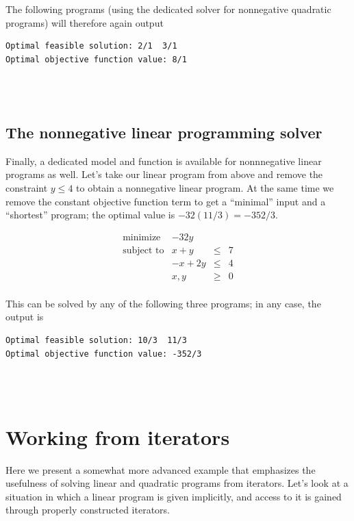 The following programs (using the dedicated solver for nonnegative
quadratic programs) will therefore again output
\begin{verbatim}
Optimal feasible solution: 2/1  3/1
Optimal objective function value: 8/1
\end{verbatim}

\\
\\

\subsection{The nonnegative linear programming solver}
Finally, a dedicated model and function is available for nonnnegative linear
programs as well. Let's take our linear program from above and remove
the constraint $y\leq 4$ to obtain a nonnegative linear program. At
the same time we remove the constant objective function term to get
a ``minimal'' input and a ``shortest'' program; the optimal value is
$-32(11/3)=-352/3$.

\[
\begin{array}{lrcl}
\mbox{minimize}       & - 32y \\
\mbox{subject to}     & x + y &\leq& 7 \\
                      & -x + 2y &\leq& 4 \\
                      & x,y &\geq& 0 \\
\end{array}
\] 

This can be solved by any of the following three programs; in
any case, the output is
\begin{verbatim}
Optimal feasible solution: 10/3  11/3
Optimal objective function value: -352/3
\end{verbatim}

\\
\\

\section{Working from iterators}
\label{sec:QP-iterators}
Here we present a somewhat more advanced example that emphasizes the
usefulness of solving linear and quadratic programs from iterators. 
Let's look at a situation in which a linear program is given implicitly, 
and access to it is gained through properly constructed iterators.

